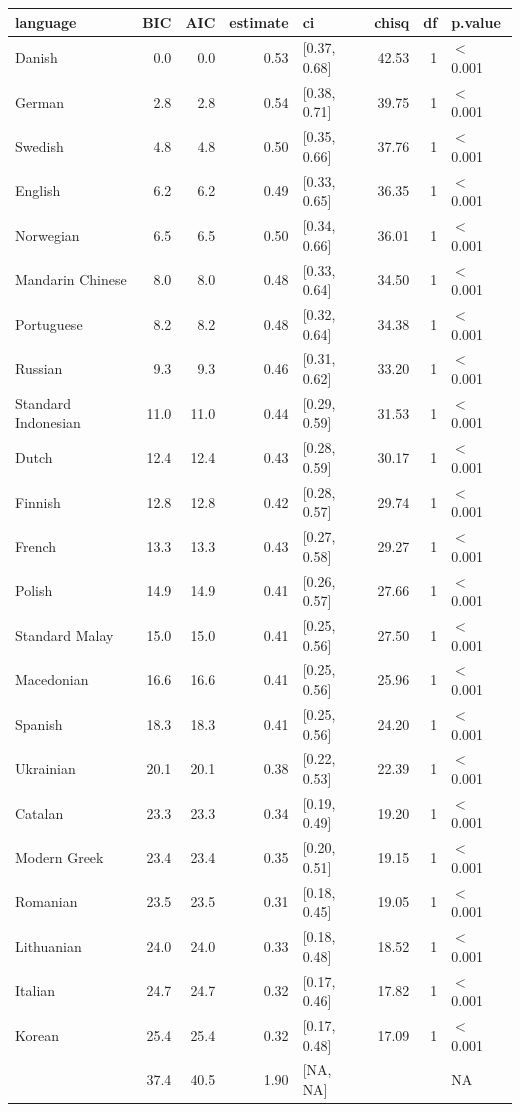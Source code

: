 \begin{table}[ht]
\centering
\begin{tabular}{lrrrlrrl}
  \hline
language & BIC & AIC & estimate & ci & chisq & df & p.value \\ 
  \hline
Danish & 0.0 & 0.0 & 0.53 & [0.37, 0.68] & 42.53 & 1 & $<$ 0.001 \\ 
  German & 2.8 & 2.8 & 0.54 & [0.38, 0.71] & 39.75 & 1 & $<$ 0.001 \\ 
  Swedish & 4.8 & 4.8 & 0.50 & [0.35, 0.66] & 37.76 & 1 & $<$ 0.001 \\ 
  English & 6.2 & 6.2 & 0.49 & [0.33, 0.65] & 36.35 & 1 & $<$ 0.001 \\ 
  Norwegian & 6.5 & 6.5 & 0.50 & [0.34, 0.66] & 36.01 & 1 & $<$ 0.001 \\ 
  Mandarin Chinese & 8.0 & 8.0 & 0.48 & [0.33, 0.64] & 34.50 & 1 & $<$ 0.001 \\ 
  Portuguese & 8.2 & 8.2 & 0.48 & [0.32, 0.64] & 34.38 & 1 & $<$ 0.001 \\ 
  Russian & 9.3 & 9.3 & 0.46 & [0.31, 0.62] & 33.20 & 1 & $<$ 0.001 \\ 
  Standard Indonesian & 11.0 & 11.0 & 0.44 & [0.29, 0.59] & 31.53 & 1 & $<$ 0.001 \\ 
  Dutch & 12.4 & 12.4 & 0.43 & [0.28, 0.59] & 30.17 & 1 & $<$ 0.001 \\ 
  Finnish & 12.8 & 12.8 & 0.42 & [0.28, 0.57] & 29.74 & 1 & $<$ 0.001 \\ 
  French & 13.3 & 13.3 & 0.43 & [0.27, 0.58] & 29.27 & 1 & $<$ 0.001 \\ 
  Polish & 14.9 & 14.9 & 0.41 & [0.26, 0.57] & 27.66 & 1 & $<$ 0.001 \\ 
  Standard Malay & 15.0 & 15.0 & 0.41 & [0.25, 0.56] & 27.50 & 1 & $<$ 0.001 \\ 
  Macedonian & 16.6 & 16.6 & 0.41 & [0.25, 0.56] & 25.96 & 1 & $<$ 0.001 \\ 
  Spanish & 18.3 & 18.3 & 0.41 & [0.25, 0.56] & 24.20 & 1 & $<$ 0.001 \\ 
  Ukrainian & 20.1 & 20.1 & 0.38 & [0.22, 0.53] & 22.39 & 1 & $<$ 0.001 \\ 
  Catalan & 23.3 & 23.3 & 0.34 & [0.19, 0.49] & 19.20 & 1 & $<$ 0.001 \\ 
  Modern Greek & 23.4 & 23.4 & 0.35 & [0.20, 0.51] & 19.15 & 1 & $<$ 0.001 \\ 
  Romanian & 23.5 & 23.5 & 0.31 & [0.18, 0.45] & 19.05 & 1 & $<$ 0.001 \\ 
  Lithuanian & 24.0 & 24.0 & 0.33 & [0.18, 0.48] & 18.52 & 1 & $<$ 0.001 \\ 
  Italian & 24.7 & 24.7 & 0.32 & [0.17, 0.46] & 17.82 & 1 & $<$ 0.001 \\ 
  Korean & 25.4 & 25.4 & 0.32 & [0.17, 0.48] & 17.09 & 1 & $<$ 0.001 \\ 
   & 37.4 & 40.5 & 1.90 & [NA, NA] &  &  & NA \\ 
   \hline
\end{tabular}
\end{table}
